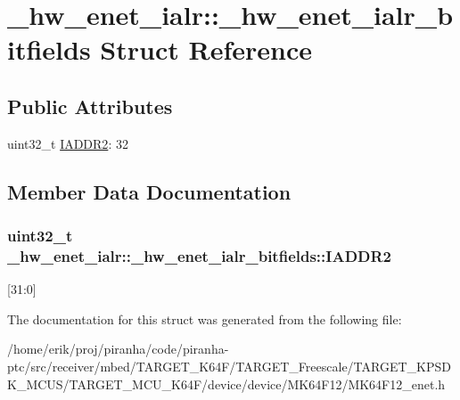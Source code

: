 \hypertarget{struct__hw__enet__ialr_1_1__hw__enet__ialr__bitfields}{}\section{\+\_\+hw\+\_\+enet\+\_\+ialr\+:\+:\+\_\+hw\+\_\+enet\+\_\+ialr\+\_\+bitfields Struct Reference}
\label{struct__hw__enet__ialr_1_1__hw__enet__ialr__bitfields}
\subsection*{Public Attributes}
\begin{DoxyCompactItemize}
\item 
uint32\+\_\+t \hyperlink{struct__hw__enet__ialr_1_1__hw__enet__ialr__bitfields_a8c40c80bc9218d39acb32381eab64246}{I\+A\+D\+D\+R2}\+: 32
\end{DoxyCompactItemize}


\subsection{Member Data Documentation}
\subsubsection[{\texorpdfstring{I\+A\+D\+D\+R2}{IADDR2}}]{\setlength{\rightskip}{0pt plus 5cm}uint32\+\_\+t \+\_\+hw\+\_\+enet\+\_\+ialr\+::\+\_\+hw\+\_\+enet\+\_\+ialr\+\_\+bitfields\+::\+I\+A\+D\+D\+R2}\hypertarget{struct__hw__enet__ialr_1_1__hw__enet__ialr__bitfields_a8c40c80bc9218d39acb32381eab64246}{}\label{struct__hw__enet__ialr_1_1__hw__enet__ialr__bitfields_a8c40c80bc9218d39acb32381eab64246}
\mbox{[}31\+:0\mbox{]} 

The documentation for this struct was generated from the following file\+:\begin{DoxyCompactItemize}
\item 
/home/erik/proj/piranha/code/piranha-\/ptc/src/receiver/mbed/\+T\+A\+R\+G\+E\+T\+\_\+\+K64\+F/\+T\+A\+R\+G\+E\+T\+\_\+\+Freescale/\+T\+A\+R\+G\+E\+T\+\_\+\+K\+P\+S\+D\+K\+\_\+\+M\+C\+U\+S/\+T\+A\+R\+G\+E\+T\+\_\+\+M\+C\+U\+\_\+\+K64\+F/device/device/\+M\+K64\+F12/M\+K64\+F12\+\_\+enet.\+h\end{DoxyCompactItemize}
